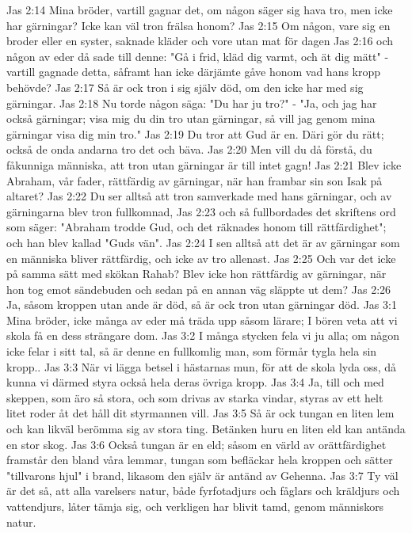 Jas 2:14  Mina bröder, vartill gagnar det, om någon säger sig hava tro, men icke har gärningar? Icke kan väl tron frälsa honom?
Jas 2:15  Om någon, vare sig en broder eller en syster, saknade kläder och vore utan mat för dagen
Jas 2:16  och någon av eder då sade till denne: "Gå i frid, kläd dig varmt, och ät dig mätt" - vartill gagnade detta, såframt han icke därjämte gåve honom vad hans kropp behövde?
Jas 2:17  Så är ock tron i sig själv död, om den icke har med sig gärningar.
Jas 2:18  Nu torde någon säga: "Du har ju tro?" - "Ja, och jag har också gärningar; visa mig du din tro utan gärningar, så vill jag genom mina gärningar visa dig min tro."
Jas 2:19  Du tror att Gud är en. Däri gör du rätt; också de onda andarna tro det och bäva.
Jas 2:20  Men vill du då förstå, du fåkunniga människa, att tron utan gärningar är till intet gagn!
Jas 2:21  Blev icke Abraham, vår fader, rättfärdig av gärningar, när han frambar sin son Isak på altaret?
Jas 2:22  Du ser alltså att tron samverkade med hans gärningar, och av gärningarna blev tron fullkomnad,
Jas 2:23  och så fullbordades det skriftens ord som säger: "Abraham trodde Gud, och det räknades honom till rättfärdighet"; och han blev kallad "Guds vän".
Jas 2:24  I sen alltså att det är av gärningar som en människa bliver rättfärdig, och icke av tro allenast.
Jas 2:25  Och var det icke på samma sätt med skökan Rahab? Blev icke hon rättfärdig av gärningar, när hon tog emot sändebuden och sedan på en annan väg släppte ut dem?
Jas 2:26  Ja, såsom kroppen utan ande är död, så är ock tron utan gärningar död.
Jas 3:1  Mina bröder, icke många av eder må träda upp såsom lärare; I bören veta att vi skola få en dess strängare dom.
Jas 3:2  I många stycken fela vi ju alla; om någon icke felar i sitt tal, så är denne en fullkomlig man, som förmår tygla hela sin kropp..
Jas 3:3  När vi lägga betsel i hästarnas mun, för att de skola lyda oss, då kunna vi därmed styra också hela deras övriga kropp.
Jas 3:4  Ja, till och med skeppen, som äro så stora, och som drivas av starka vindar, styras av ett helt litet roder åt det håll dit styrmannen vill.
Jas 3:5  Så är ock tungan en liten lem och kan likväl berömma sig av stora ting. Betänken huru en liten eld kan antända en stor skog.
Jas 3:6  Också tungan är en eld; såsom en värld av orättfärdighet framstår den bland våra lemmar, tungan som befläckar hela kroppen och sätter "tillvarons hjul" i brand, likasom den själv är antänd av Gehenna.
Jas 3:7  Ty väl är det så, att alla varelsers natur, både fyrfotadjurs och fåglars och kräldjurs och vattendjurs, låter tämja sig, och verkligen har blivit tamd, genom människors natur.
